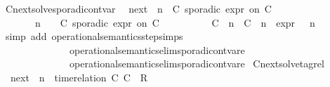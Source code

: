\begin{isabellebody}
\endisatagproof
{\isafoldproof}%
%
\isadelimproof
\isanewline
%
\endisadelimproof
\isanewline
{}\isamarkupfalse%
\ Cnext{\isacharunderscore}solve{\isacharunderscore}sporadicon{\isacharunderscore}tvar{\isacharcolon}\isanewline
\ \ {\isacartoucheopen}{\isacharparenleft}{\isasymC}\isactrlsub n\isactrlsub e\isactrlsub x\isactrlsub t\ {\isacharparenleft}{\isasymGamma}{\isacharcomma}\ n\ {\isasymturnstile}\ {\isacharparenleft}{\isacharparenleft}C\ sporadic{\isasymsharp}\ {\isasymtau}\isactrlsub e\isactrlsub x\isactrlsub p\isactrlsub r\ on\ C\ {\isacharhash}\ {\isasymPsi}{\isacharparenright}\ {\isasymtriangleright}\ {\isasymPhi}{\isacharparenright}{\isacharparenright}\isanewline
\ \ \ \ {\isasymsupseteq}\ {\isacharbraceleft}\ {\isasymGamma}{\isacharcomma}\ n\ {\isasymturnstile}\ {\isasymPsi}\ {\isasymtriangleright}\ {\isacharparenleft}{\isacharparenleft}C\ sporadic{\isasymsharp}\ {\isasymtau}\isactrlsub e\isactrlsub x\isactrlsub p\isactrlsub r\ on\ C\ {\isacharhash}\ {\isasymPhi}{\isacharparenright}{\isacharcomma}\isanewline
\ \ \ \ \ \ \ \ {\isacharparenleft}{\isacharparenleft}C\ {\isasymUp}\ n{\isacharparenright}\ {\isacharhash}\ {\isacharparenleft}C\ {\isasymDown}\ n\ {\isacharat}{\isasymsharp}\ {\isasymtau}\isactrlsub e\isactrlsub x\isactrlsub p\isactrlsub r{\isacharparenright}\ {\isacharhash}\ {\isasymGamma}{\isacharparenright}{\isacharcomma}\ n\ {\isasymturnstile}\ {\isasymPsi}\ {\isasymtriangleright}\ {\isasymPhi}\ {\isacharbraceright}{\isacartoucheclose}\isanewline
%
\isadelimproof
%
\endisadelimproof
%
\isatagproof
{}\isamarkupfalse%
\ {\isacharparenleft}simp\ add{\isacharcolon}\ operational{\isacharunderscore}semantics{\isacharunderscore}step{\isachardot}simps\isanewline
\ \ \ \ \ \ \ \ \ \ \ \ \ \ operational{\isacharunderscore}semantics{\isacharunderscore}elim{\isachardot}sporadic{\isacharunderscore}on{\isacharunderscore}tvar{\isacharunderscore}e{}\isanewline
\ \ \ \ \ \ \ \ \ \ \ \ \ \ operational{\isacharunderscore}semantics{\isacharunderscore}elim{\isachardot}sporadic{\isacharunderscore}on{\isacharunderscore}tvar{\isacharunderscore}e{}{\isacharparenright}%
\endisatagproof
{\isafoldproof}%
%
\isadelimproof
\isanewline
%
\endisadelimproof
\isanewline
{}\isamarkupfalse%
\ Cnext{\isacharunderscore}solve{\isacharunderscore}tagrel{\isacharcolon}\isanewline
\ \ {\isacartoucheopen}{\isacharparenleft}{\isasymC}\isactrlsub n\isactrlsub e\isactrlsub x\isactrlsub t\ {\isacharparenleft}{\isasymGamma}{\isacharcomma}\ n\ {\isasymturnstile}\ {\isacharparenleft}{\isacharparenleft}time{\isacharminus}relation\ {\isasymlfloor}C\ C\ {\isasymin}\ R{\isacharparenright}\ {\isacharhash}\ {\isasymPsi}{\isacharparenright}\ {\isasymtriangleright}\ {\isasymPhi}{\isacharparenright}{\isacharparenright}\isanewline

\end{isabellebody}
